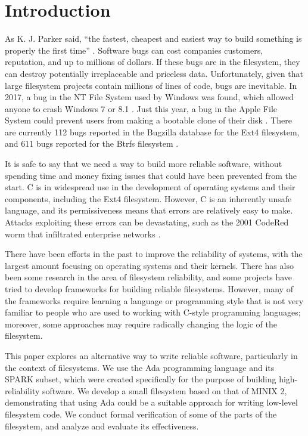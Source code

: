 \section{Introduction}
As K. J. Parker said, ``the fastest, cheapest and easiest way to build something is properly the first time'' \cite{parker2007}.
Software bugs can cost companies customers, reputation, and up to millions of dollars.
If these bugs are in the filesystem, they can destroy potentially irreplaceable and priceless data.
Unfortunately, given that large filesystem projects contain millions of lines of code, bugs are inevitable.
In 2017, a bug in the NT File System used by Windows was found, which allowed anyone to crash Windows 7 or 8.1 \cite{bright2017}.
Just this year, a bug in the Apple File System could prevent users from making a bootable clone of their disk \cite{bombich2020}.
There are currently 112 bugs reported in the Bugzilla database for the Ext4 filesystem, and 611 bugs reported for the Btrfs filesystem \cite{bugzilla2020}.

It is safe to say that we need a way to build more reliable software, without spending time and money fixing issues that could have been prevented from the start.
C is in widespread use in the development of operating systems and their components, including the Ext4 filesystem.
However, C is an inherently unsafe language, and its permissiveness means that errors are relatively easy to make.
Attacks exploiting these errors can be devastating, such as the 2001 CodeRed worm that infiltrated enterprise networks \cite{trendmicro2002}.

There have been efforts in the past to improve the reliability of systems, with the largest amount focusing on operating systems and their kernels.
There has also been some research in the area of filesystem reliability, and some projects have tried to develop frameworks for building reliable filesystems.
However, many of the frameworks require learning a language or programming style that is not very familiar to people who are used to working with C-style programming languages; moreover, some approaches may require radically changing the logic of the filesystem.

This paper explores an alternative way to write reliable software, particularly in the context of filesystems.
We use the Ada programming language and its SPARK subset, which were created specifically for the purpose of building high-reliability software.
We develop a small filesystem based on that of MINIX 2, demonstrating that using Ada could be a suitable approach for writing low-level filesystem code.
We conduct formal verification of some of the parts of the filesystem, and analyze and evaluate its effectiveness.

